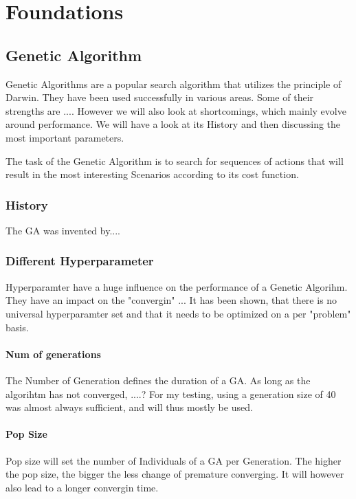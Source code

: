 \chapter{Foundations}

\section{Genetic Algorithm}
Genetic Algorithms are a popular search algorithm that utilizes the principle of Darwin. They have been used successfully in various areas.
Some of their strengths are ....
However we will also look at shortcomings, which mainly evolve around performance.
We will have a look at its History and then discussing the most important parameters.

The task of the Genetic Algorithm is to search for sequences of actions that will result in the most interesting Scenarios according to its cost function.


\subsection{History}
The GA was invented by....


\subsection{Different Hyperparameter}
Hyperparamter have a huge influence on the performance of a Genetic Algorihm. They have an impact on the "convergin" ...
It has been shown, that there is no universal hyperparamter set and that it needs to be optimized on a per "problem" basis.

\subsubsection{Num of generations}
The Number of Generation defines the duration of a GA. As long as the algorihtm has not converged, ....?
For my testing, using a generation size of 40 was almost always sufficient, and will thus mostly be used.

\subsubsection{Pop Size}
Pop size will set the number of Individuals of a GA per Generation. The higher the pop size, the bigger the less change of premature converging. 
It will however also lead to a longer convergin time.

